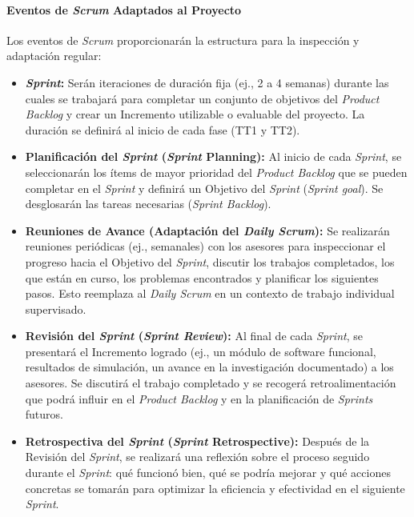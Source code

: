 \documentclass[12pt]{article}
\begin{document}
\paragraph{Eventos de \textit{Scrum} Adaptados al Proyecto}
\label{sssec:eventos_scrum_proyecto}
Los eventos de \textit{Scrum} proporcionarán la estructura para la inspección y adaptación regular:
\begin{itemize}
    \item \textbf{\textit{Sprint}:} Serán iteraciones de duración fija (ej., 2 a 4 semanas) durante las cuales se trabajará para completar un conjunto de objetivos del \textit{Product Backlog} y crear un Incremento utilizable o evaluable del proyecto. La duración se definirá al inicio de cada fase (TT1 y TT2).
    \item \textbf{Planificación del \textit{Sprint} (\textit{Sprint} Planning):} Al inicio de cada \textit{Sprint}, se seleccionarán los ítems de mayor prioridad del \textit{Product Backlog} que se pueden completar en el \textit{Sprint} y definirá un Objetivo del \textit{Sprint} (\textit{Sprint goal}). Se desglosarán las tareas necesarias (\textit{Sprint Backlog}).
    \item \textbf{Reuniones de Avance (Adaptación del \textit{Daily Scrum}):} Se realizarán reuniones periódicas (ej., semanales) con los asesores para inspeccionar el progreso hacia el Objetivo del \textit{Sprint}, discutir los trabajos completados, los que están en curso, los problemas encontrados y planificar los siguientes pasos. Esto reemplaza al \textit{Daily Scrum} en un contexto de trabajo individual supervisado.
    \item \textbf{Revisión del \textit{Sprint} (\textit{Sprint Review}):} Al final de cada \textit{Sprint}, se presentará el Incremento logrado (ej., un módulo de software funcional, resultados de simulación, un avance en la investigación documentado) a los asesores. Se discutirá el trabajo completado y se recogerá retroalimentación que podrá influir en el \textit{Product Backlog} y en la planificación de \textit{Sprints} futuros.
    \item \textbf{Retrospectiva del \textit{Sprint} (\textit{Sprint} Retrospective):} Después de la Revisión del \textit{Sprint}, se realizará una reflexión sobre el proceso seguido durante el \textit{Sprint}: qué funcionó bien, qué se podría mejorar y qué acciones concretas se tomarán para optimizar la eficiencia y efectividad en el siguiente \textit{Sprint}.
\end{itemize}
\end{document}
